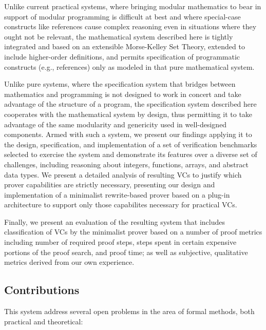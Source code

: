 Unlike current practical systems, where bringing modular mathematics to bear in support of modular programming is difficult at best and where special-case constructs like references cause complex reasoning even in situations where they ought not be relevant, the mathematical system described here is tightly integrated and based on an extensible Morse-Kelley Set Theory, extended to include higher-order definitions, and permits specification of programmatic constructs (e.g., references) only as modeled in that pure mathematical system.

Unlike pure systems, where the specification system that bridges between mathematics and programming is not designed to work in concert and take advantage of the structure of a program, the specification system described here cooperates with the mathematical system by design, thus permitting it to take advantage of the same modularity and genericity used in well-designed components. Armed with such a system, we present our findings applying it to the design, specification, and implementation of a set of verification benchmarks selected to exercise the system and demonstrate its features over a diverse set of challenges, including reasoning about integers, functions, arrays, and abstract data types.  We present a detailed analysis of resulting VCs to justify which prover capabilities are strictly necessary, presenting our design and implementation of a minimalist rewrite-based prover based on a plug-in architecture to support only those capabilites necessary for practical VCs.

Finally, we present an evaluation of the resulting system that includes classification of VCs by the minimalist prover based on a number of proof metrics including number of required proof steps, steps spent in certain expensive portions of the proof search, and proof time; as well as subjective, qualitative metrics derived from our own experience.

\subsection{Contributions\label{sec:contributions}}
This system address several open problems in the area of formal methods, both practical and theoretical:

